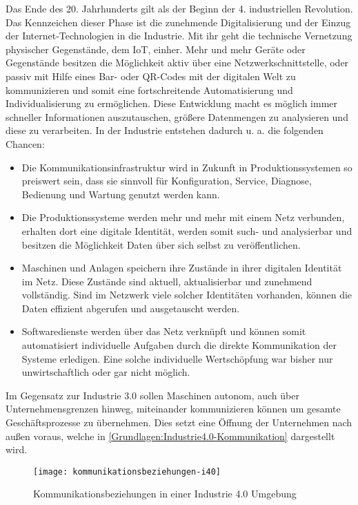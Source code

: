Das Ende des 20. Jahrhunderts gilt als der Beginn der 4. industriellen Revolution. Das Kennzeichen dieser Phase ist die zunehmende Digitalisierung und der Einzug der Internet-Technologien in die Industrie. Mit ihr geht die technische Vernetzung physischer Gegenstände, dem \ac{IoT}, einher. Mehr und mehr Geräte oder Gegenstände besitzen die Möglichkeit aktiv über eine Netzwerkschnittstelle, oder passiv mit Hilfe eines Bar- oder QR-Codes mit der digitalen Welt zu kommunizieren und somit eine fortschreitende Automatisierung und Individualisierung zu ermöglichen. Diese Entwicklung macht es möglich immer schneller Informationen auszutauschen, größere Datenmengen zu analysieren und diese zu verarbeiten. In der Industrie entstehen dadurch u. a. die folgenden Chancen:

\begin{itemize}
  \item Die Kommunikationsinfrastruktur wird in Zukunft in Produktionssystemen so preiswert sein, dass sie sinnvoll für Konfiguration, Service, Diagnose, Bedienung und Wartung genutzt werden kann.
  \item Die Produktionssysteme werden mehr und mehr mit einem Netz verbunden, erhalten dort eine digitale Identität, werden somit such- und analysierbar und besitzen die Möglichkeit Daten über sich selbst zu veröffentlichen. 
  \item Maschinen und Anlagen speichern ihre Zustände in ihrer digitalen Identität im Netz. Diese Zustände sind aktuell, aktualisierbar und zunehmend vollständig. Sind im Netzwerk viele solcher Identitäten vorhanden, können die Daten effizient abgerufen und ausgetauscht werden.
  \item Softwaredienste werden über das Netz verknüpft und können somit automatisiert individuelle Aufgaben durch die direkte Kommunikation der Systeme erledigen. Eine solche individuelle Wertschöpfung war bisher nur unwirtschaftlich oder gar nicht möglich.
\end{itemize}

Im Gegensatz zur Industrie 3.0 sollen Maschinen autonom, auch über Unternehmensgrenzen hinweg, miteinander kommunizieren können um gesamte Geschäftsprozesse zu übernehmen. Dies setzt eine Öffnung der Unternehmen nach außen voraus, welche in \autoref{Grundlagen:Industrie4.0-Kommunikation} dargestellt wird.

\begin{figure}[h]
  \centering
  \texttt{[image: kommunikationsbeziehungen-i40]}
  \caption{Kommunikationsbeziehungen in einer Industrie 4.0 Umgebung}
  \label{Grundlagen:Industrie4.0-Kommunikation}
\end{figure}

